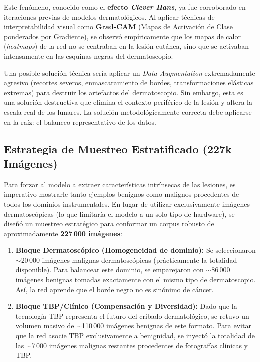 Este fenómeno, conocido como el \textbf{efecto \textit{Clever Hans}}, ya fue corroborado en iteraciones previas de modelos dermatológicos. Al aplicar técnicas de interpretabilidad visual como \textbf{Grad-CAM} (Mapas de Activación de Clase ponderados por Gradiente), se observó empíricamente que los mapas de calor (\textit{heatmaps}) de la red no se centraban en la lesión cutánea, sino que se activaban intensamente en las esquinas negras del dermatoscopio. 

Una posible solución técnica sería aplicar un \textit{Data Augmentation} extremadamente agresivo (recortes severos, enmascaramiento de bordes, transformaciones elásticas extremas) para destruir los artefactos del dermatoscopio. Sin embargo, esta es una solución destructiva que elimina el contexto periférico de la lesión y altera la escala real de los lunares. La solución metodológicamente correcta debe aplicarse en la raíz: el balanceo representativo de los datos.

\subsection{Estrategia de Muestreo Estratificado (227k Imágenes)}
Para forzar al modelo a extraer características intrínsecas de las lesiones, es imperativo mostrarle tanto ejemplos benignos como malignos procedentes de todos los dominios instrumentales. En lugar de utilizar exclusivamente imágenes dermatoscópicas (lo que limitaría el modelo a un solo tipo de hardware), se diseñó un muestreo estratégico para conformar un corpus robusto de aproximadamente \textbf{227\,000 imágenes}:

\begin{enumerate}
	\item \textbf{Bloque Dermatoscópico (Homogeneidad de dominio):} Se seleccionaron $\sim$20\,000 imágenes malignas dermatoscópicas (prácticamente la totalidad disponible). Para balancear este dominio, se emparejaron con $\sim$86\,000 imágenes benignas tomadas exactamente con el mismo tipo de dermatoscopio. Así, la red aprende que el borde negro no es sinónimo de cáncer.
	
	\item \textbf{Bloque TBP/Clínico (Compensación y Diversidad):} Dado que la tecnología TBP representa el futuro del cribado dermatológico, se retuvo un volumen masivo de $\sim$110\,000 imágenes benignas de este formato. Para evitar que la red asocie TBP exclusivamente a benignidad, se inyectó la totalidad de las $\sim$7\,000 imágenes malignas restantes procedentes de fotografías clínicas y TBP.
\end{enumerate}

